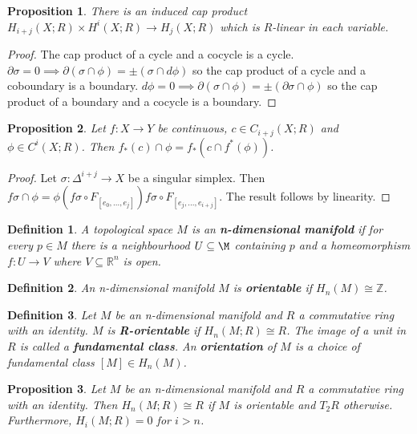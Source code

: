 \documentclass{report}
\newtheorem{definition}{Definition}
\newtheorem{proposition}{Proposition}
\begin{document}
\begin{proposition}
There is an induced cap product $H_{i+j}(X;R)\times H^i(X;R)\to H_j(X;R)$ which is $R$-linear in each variable.
\end{proposition}
\begin{proof}
The cap product of a cycle and a cocycle is a cycle. $\partial\sigma=0\implies\partial(\sigma\cap\phi)=\pm(\sigma\cap d\phi)$ so the cap product of a cycle and a coboundary is a boundary. $d\phi=0\implies\partial(\sigma\cap\phi)=\pm(\partial\sigma\cap\phi)$ so the cap product of a boundary and a cocycle is a boundary.
\end{proof}

\begin{proposition}
Let $f\colon X\to Y$ be continuous, $c\in C_{i+j}(X;R)$ and $\phi\in C^i(X;R)$. Then $f_*(c)\cap\phi=f_*(c\cap f^*(\phi))$.
\end{proposition}
\begin{proof}
Let $\sigma\colon\Delta^{i+j}\to X$ be a singular simplex. Then $f\sigma\cap\phi=\phi(f\sigma\circ F_{[e_0,...,e_j]})f\sigma\circ F_{[e_j,...,e_{i+j}]}$.
The result follows by linearity.
\end{proof}

\begin{definition}
A topological space $M$ is an \textbf{n-dimensional manifold} if for every $p\in M$ there is a neighbourhood $U\subseteq\M$ containing $p$ and a homeomorphism $f\colon U\to V$ where $V\subseteq\mathbb{R}^n$ is open.
\end{definition}

\begin{definition}
An n-dimensional manifold $M$ is \textbf{orientable} if $H_n(M)\cong \mathbb{Z}$.
\end{definition}

\begin{definition}
Let $M$ be an n-dimensional manifold and $R$ a commutative ring with an identity. $M$ is \textbf{R-orientable} if $H_n(M;R)\cong R$. The image of a unit in $R$ is called a \textbf{fundamental class}. An \textbf{orientation} of $M$ is a choice of fundamental class $[M]\in H_n(M)$.
\end{definition}

\begin{proposition}
Let $M$ be an n-dimensional manifold and $R$ a commutative ring with an identity. Then $H_n(M;R)\cong R$ if $M$ is orientable and $T_2R$ otherwise. Furthermore, $H_i(M;R)=0$ for $i>n$.
\end{proposition}
\end{document}

